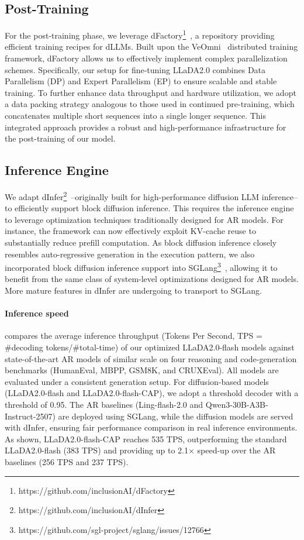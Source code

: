 \subsection{Post-Training}
For the post-training phase, we leverage dFactory\footnote{https://github.com/inclusionAI/dFactory}~\citep{dfactory}, a repository providing efficient training recipes for dLLMs. Built upon the VeOmni~\citep{ma2025veomni} distributed training framework, dFactory allows us to effectively implement complex parallelization schemes. Specifically, our setup for fine-tuning LLaDA2.0 combines Data Parallelism (DP) and Expert Parallelism (EP) to ensure scalable and stable training. To further enhance data throughput and hardware utilization, we adopt a data packing strategy analogous to those used in continued pre-training, which concatenates multiple short sequences into a single longer sequence. This integrated approach provides a robust and high-performance infrastructure for the post-training of our model.

\subsection{Inference Engine}
We adapt dInfer\footnote{https://github.com/inclusionAI/dInfer}~\citep{dinfer}--originally built for high-performance diffusion LLM inference--to efficiently support block diffusion inference. This requires the inference engine to leverage optimization techniques traditionally designed for AR models. For instance, the framework can now effectively exploit KV-cache reuse to substantially reduce prefill computation.
As block diffusion inference closely resembles auto-regressive generation in the execution pattern, we also incorporated block diffusion inference support into SGLang\footnote{https://github.com/sgl-project/sglang/issues/12766}~\citep{sglang}, allowing it to benefit from the same class of system-level optimizations designed for AR models. More mature features in dInfer are undergoing to transport to SGLang. 


\paragraph{Inference speed}

 compares the average inference throughput (Tokens Per Second, TPS = \#decoding tokens/\#total-time) of our optimized LLaDA2.0-flash models against state-of-the-art AR models of similar scale on four reasoning and code-generation benchmarks (HumanEval, MBPP, GSM8K, and CRUXEval). All models are evaluated under a consistent generation setup. For diffusion-based models (LLaDA2.0-flash and LLaDA2.0-flash-CAP), we adopt a threshold decoder with a threshold of 0.95. The AR baselines (Ling-flash-2.0 and Qwen3-30B-A3B-Instruct-2507) are deployed using SGLang, while the diffusion models are served with dInfer, ensuring fair performance comparison in real inference environments.
As shown, LLaDA2.0-flash-CAP reaches 535 TPS, outperforming the standard LLaDA2.0-flash (383 TPS) and providing up to 2.1× speed-up over the AR baselines (256 TPS and 237 TPS).
